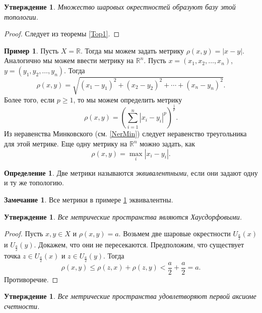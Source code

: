 \documentclass[12pt, titlepage, oneside]{amsbook}
\newcommand{\RR}{\mathbb{R}}
\newtheorem{claim}[theorem]{Утверждение}
\theoremstyle{definition}
\newtheorem{example}[theorem]{Пример}
\newtheorem{definition}[theorem]{Определение}
\newtheorem{remark}[theorem]{Замечание}
\theoremstyle{remark}
\begin{document}
 \begin{claim}
\label{Met4}
Множество шаровых окрестностей образуют базу этой топологии.
\end{claim}

\begin{proof}
Следует из теоремы \ref{Top1}.
\end{proof}

\begin{example}
\label{Ex1}
Пусть $X=\RR$. Тогда мы можем задать метрику $\rho(x,y)=|x-y|$. Аналогично мы можем ввести метрику на $\RR^n$. Пусть $x=(x_1,x_2,\ldots,x_n)$, $y=(y_1,y_2,\ldots,y_n)$. Тогда $$\rho(x,y)=\sqrt{(x_1-y_1)^2+(x_2-y_2)^2+\cdots+(x_n-y_n)^2}.$$ Более того, если $p\geq 1$, то мы можем определить метрику $$\rho(x,y)=\left(\sum\limits_{i=1}^n|x_i-y_i|^p\right)^{\frac{1}{p}}.$$ Из неравенства Минковского (см. \ref{NerMin}) следует неравенство треугольника для этой метрике. Еще одну метрику на $\RR^n$ можно задать, как $$\rho(x,y)=\max\limits_i |x_i-y_i|.$$
\end{example}

\begin{definition}
Две метрики называются \emph{эквивалентными}, если они задают одну и ту же топологию.
\end{definition}

\begin{remark}
Все метрики в примере \ref{Ex1} эквивалентны.
\end{remark}

 \begin{claim}
\label{Met5}
Все метрические пространства являются Хаусдорфовыми.
\end{claim}

\begin{proof}
Пусть $x,y\in X$ и $\rho(x,y)=a$. Возьмем две шаровые окрестности $U_{\frac{a}{2}}(x)$ и $U_{\frac{a}{2}}(y)$. Докажем, что они не пересекаются. Предположим, что существует точка $z\in U_{\frac{a}{2}}(x)$ и $z\in U_{\frac{a}{2}}(y)$. Тогда $$\rho(x,y)\leq\rho(z,x)+\rho(z,y)<\frac{a}{2}+\frac{a}{2}=a.$$ Противоречие.
\end{proof}

 \begin{claim}
\label{Met6}
Все метрические пространства удовлетворяют первой аксиоме счетности.
\end{claim}
\end{document}
